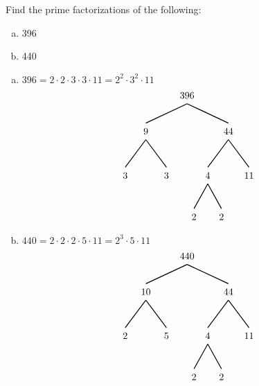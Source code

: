 \documentclass[12pt,letterpaper]{exam}
\begin{document}
\begin{questions}

\newpage
\question[5] Find the prime factorizations of the following:
	\begin{enumerate}[(a)]
	\item 396
	\item 440
	\end{enumerate} \pspace

\sol
\begin{enumerate}[(a)]
\item $396= 2 \cdot 2 \cdot 3 \cdot 3 \cdot 11= 2^2 \cdot 3^2 \cdot 11$ \pspace
	\[
	\begin{tikzpicture}
	\node at (0,0) {$396$};
	\node at (-1.5,-1.3) {$9$}; \draw[line width=0.03cm] (-1.5,-1) -- (0,-0.3);
	\node at (1.5,-1.3) {$44$}; \draw[line width=0.03cm] (1.5,-1) -- (0,-0.3);
	
	\node at (-2.25,-2.9) {$3$}; \draw[line width=0.03cm] (-2.25,-2.6) -- (-1.5,-1.6);
	\node at (-0.75,-2.9) {$3$}; \draw[line width=0.03cm] (-0.75,-2.6) -- (-1.5,-1.6);
	\node at (0.75,-2.9) {$4$}; \draw[line width=0.03cm] (0.75,-2.6) -- (1.5,-1.6);
	\node at (2.25,-2.9) {$11$}; \draw[line width=0.03cm] (2.25,-2.6) -- (1.5,-1.6);
	
	\node at (0.25,-4.4) {$2$}; \draw[line width=0.03cm] (0.25,-4.1) -- (0.75,-3.2);
	\node at (1.25,-4.4) {$2$}; \draw[line width=0.03cm] (1.25,-4.1) -- (0.75,-3.2);
	\end{tikzpicture}
	\] \pspace

\item $440= 2 \cdot 2 \cdot 2 \cdot 5 \cdot 11= 2^3 \cdot 5 \cdot 11$ \pspace
	\[
	\begin{tikzpicture}
	\node at (0,0) {$440$};
	\node at (-1.5,-1.3) {$10$}; \draw[line width=0.03cm] (-1.5,-1) -- (0,-0.3);
	\node at (1.5,-1.3) {$44$}; \draw[line width=0.03cm] (1.5,-1) -- (0,-0.3);
	
	\node at (-2.25,-2.9) {$2$}; \draw[line width=0.03cm] (-2.25,-2.6) -- (-1.5,-1.6);
	\node at (-0.75,-2.9) {$5$}; \draw[line width=0.03cm] (-0.75,-2.6) -- (-1.5,-1.6);
	\node at (0.75,-2.9) {$4$}; \draw[line width=0.03cm] (0.75,-2.6) -- (1.5,-1.6);
	\node at (2.25,-2.9) {$11$}; \draw[line width=0.03cm] (2.25,-2.6) -- (1.5,-1.6);
	
	\node at (0.25,-4.4) {$2$}; \draw[line width=0.03cm] (0.25,-4.1) -- (0.75,-3.2);
	\node at (1.25,-4.4) {$2$}; \draw[line width=0.03cm] (1.25,-4.1) -- (0.75,-3.2);
	\end{tikzpicture}
	\] 
\end{enumerate}




\end{questions}
\end{document}
